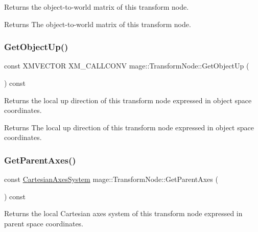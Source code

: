Returns the object-\/to-\/world matrix of this transform node.

\begin{DoxyReturn}{Returns}
The object-\/to-\/world matrix of this transform node. 
\end{DoxyReturn}
\hypertarget{classmage_1_1_transform_node_a5555620371a98a81a6459326c1ccbfe9}{}\label{classmage_1_1_transform_node_a5555620371a98a81a6459326c1ccbfe9} 
\subsubsection{\texorpdfstring{Get\+Object\+Up()}{GetObjectUp()}}
{\footnotesize\ttfamily const X\+M\+V\+E\+C\+T\+OR X\+M\+\_\+\+C\+A\+L\+L\+C\+O\+NV mage\+::\+Transform\+Node\+::\+Get\+Object\+Up (\begin{DoxyParamCaption}{ }\end{DoxyParamCaption}) const\hspace{0.3cm}{\ttfamily [noexcept]}}

Returns the local up direction of this transform node expressed in object space coordinates.

\begin{DoxyReturn}{Returns}
The local up direction of this transform node expressed in object space coordinates. 
\end{DoxyReturn}
\hypertarget{classmage_1_1_transform_node_a65a2b2cef7a43dfce2e523f78d5eeb13}{}\label{classmage_1_1_transform_node_a65a2b2cef7a43dfce2e523f78d5eeb13} 
\subsubsection{\texorpdfstring{Get\+Parent\+Axes()}{GetParentAxes()}}
{\footnotesize\ttfamily const \hyperlink{structmage_1_1_cartesian_axes_system}{Cartesian\+Axes\+System} mage\+::\+Transform\+Node\+::\+Get\+Parent\+Axes (\begin{DoxyParamCaption}{ }\end{DoxyParamCaption}) const\hspace{0.3cm}{\ttfamily [noexcept]}}

Returns the local Cartesian axes system of this transform node expressed in parent space coordinates.

